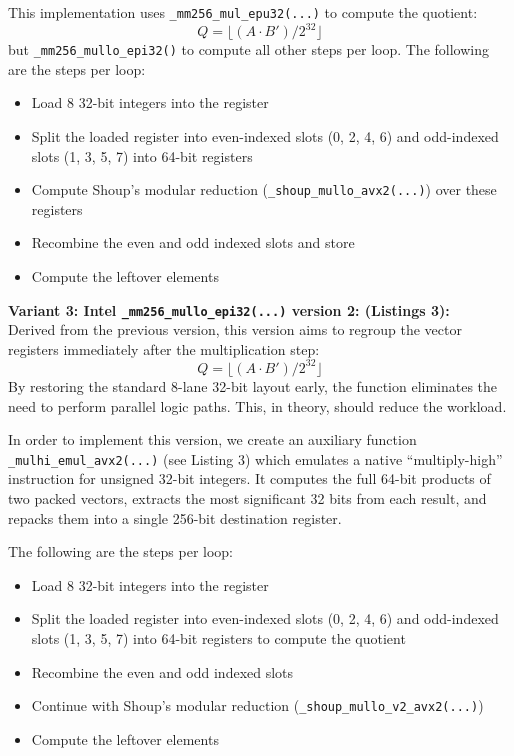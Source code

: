\documentclass{article}
\newcommand{\pointlabel}[1]{\par\smallskip\noindent\textbf{\textcolor{accentorange}{#1:}} }
\begin{document}
This implementation uses \texttt{\_mm256\_mul\_epu32(...)} to compute the quotient:
\[Q = \lfloor (A \cdot B') / 2^{32} \rfloor\]
but \texttt{\_mm256\_mullo\_epi32()} to compute all other steps per loop. The following are the steps per loop:
\begin{itemize}
    \item Load 8 32-bit integers into the register
    \item Split the loaded register into even-indexed slots (0, 2, 4, 6) and odd-indexed slots (1, 3, 5, 7) into 64-bit registers
    \item Compute Shoup's modular reduction (\texttt{\_shoup\_mullo\_avx2(...)}) over these registers
    \item Recombine the even and odd indexed slots and store
    \item Compute the leftover elements
\end{itemize}


\pointlabel{Variant 3: Intel \texttt{\_mm256\_mullo\_epi32(...)} version 2: (Listings 3)} \\
Derived from the previous version, this version aims to regroup the vector registers immediately after the
multiplication step:
\[Q = \lfloor (A \cdot B') / 2^{32} \rfloor\]
By restoring the standard 8-lane 32-bit layout early, the function eliminates the need to perform parallel logic paths.
This, in theory, should reduce the workload.

In order to implement this version, we create an auxiliary function \texttt{\_mulhi\_emul\_avx2(...)} (see Listing 3) which emulates a native ``multiply-high'' instruction for unsigned 32-bit integers. It computes the full 64-bit products of two packed vectors, extracts the most significant 32 bits from each result, and repacks them into a single 256-bit destination register.

The following are the steps per loop:
\begin{itemize}
    \item Load 8 32-bit integers into the register
    \item Split the loaded register into even-indexed slots (0, 2, 4, 6) and odd-indexed slots (1, 3, 5, 7) into 64-bit registers to compute the quotient
    \item Recombine the even and odd indexed slots
    \item Continue with Shoup's modular reduction (\texttt{\_shoup\_mullo\_v2\_avx2(...)})
    \item Compute the leftover elements
\end{itemize}
\end{document}
